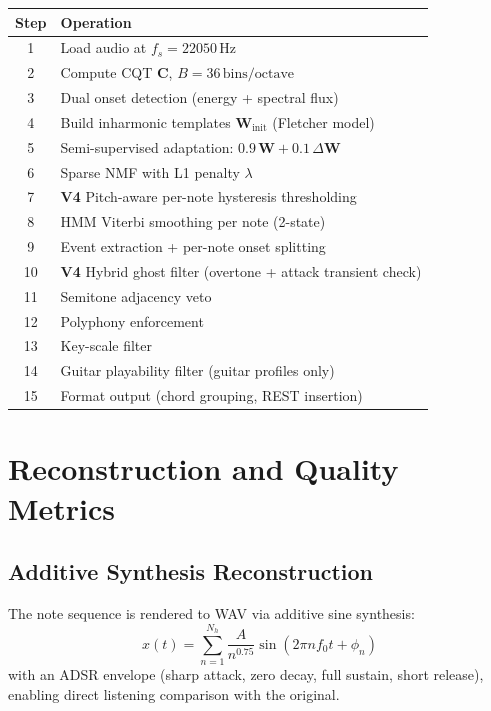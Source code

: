 \documentclass[12pt, a4paper]{article}
\begin{document}
\begin{center}
\begin{tabular}{cl}
  \toprule
  Step & Operation \\
  \midrule
  1  & Load audio at $f_s = 22050\,\text{Hz}$ \\
  2  & Compute CQT $\mathbf{C}$, $B = 36\,\text{bins/octave}$ \\
  3  & Dual onset detection (energy + spectral flux) \\
  4  & Build inharmonic templates $\mathbf{W}_{\text{init}}$ (Fletcher model) \\
  5  & Semi-supervised adaptation: $0.9\,\mathbf{W} + 0.1\,\Delta\mathbf{W}$ \\
  6  & Sparse NMF with L1 penalty $\lambda$ \\
  7  & \textbf{V4} Pitch-aware per-note hysteresis thresholding \\
  8  & HMM Viterbi smoothing per note (2-state) \\
  9  & Event extraction + per-note onset splitting \\
  10 & \textbf{V4} Hybrid ghost filter (overtone + attack transient check) \\
  11 & Semitone adjacency veto \\
  12 & Polyphony enforcement \\
  13 & Key-scale filter \\
  14 & Guitar playability filter (guitar profiles only) \\
  15 & Format output (chord grouping, REST insertion) \\
  \bottomrule
\end{tabular}
\end{center}

\section{Reconstruction and Quality Metrics}

\subsection{Additive Synthesis Reconstruction}

The note sequence is rendered to WAV via additive sine synthesis:
\begin{equation}
  x(t) = \sum_{n=1}^{N_h}\frac{A}{n^{0.75}}\sin(2\pi n f_0 t + \phi_n)
\end{equation}
with an ADSR envelope (sharp attack, zero decay, full sustain, short release),
enabling direct listening comparison with the original.
\end{document}
